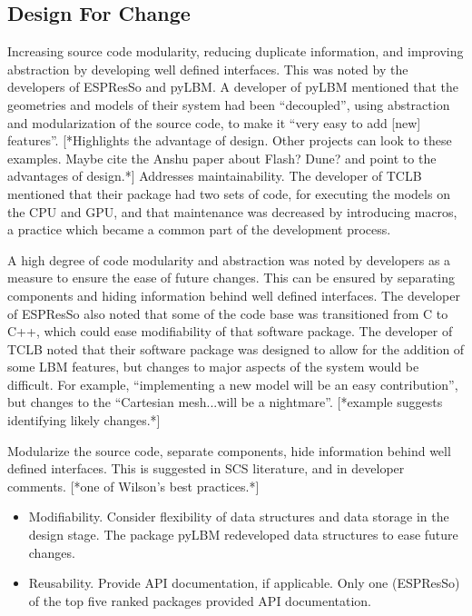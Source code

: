 \documentclass[runningheads]{llncs}
\begin{document}
\subsection{Design For Change} \label{Sec_DesForChange}

Increasing source code modularity, reducing duplicate information,
and improving abstraction by developing well defined interfaces. This was noted
by the developers of ESPResSo and pyLBM.  A developer of pyLBM mentioned that
the geometries and models of their system had been ``decoupled'', using
abstraction and modularization of the source code, to make it ``very easy to add
[new] features''.  [*{Highlights the advantage of design.  Other projects can
look to these examples.  Maybe cite the Anshu paper about Flash? Dune? and point
to the advantages of design.}*] Addresses maintainability.  The developer of TCLB
mentioned that their package had two sets of code, for executing the models on
the CPU and GPU, and that maintenance was decreased by introducing macros, a
practice which became a common part of the development process. 

A high degree of code modularity and abstraction was noted by developers as a
measure to ensure the ease of future changes. This can be ensured by separating
components and hiding information behind well defined interfaces. The developer
of ESPResSo also noted that some of the code base was transitioned from C to
C++, which could ease modifiability of that software package. The developer of
TCLB noted that their software package was designed to allow for the addition of
some LBM features, but changes to major aspects of the system would be
difficult. For example, ``implementing a new model will be an easy
contribution'', but changes to the ``Cartesian mesh...will be a nightmare''.
[*{example suggests identifying likely changes.}*]

Modularize the source code, separate components, hide information behind well
defined interfaces. This is suggested in SCS literature, and in developer
comments.  [*{one of Wilson's best practices.}*]

\begin{itemize}
	\item Modifiability. Consider flexibility of data structures and data
	storage in the design stage. The package pyLBM redeveloped data structures
	to ease future changes.
	\item Reusability. Provide API documentation, if applicable. Only one
	(ESPResSo) of the top five ranked packages provided API documentation.
\end{itemize}
\end{document}
